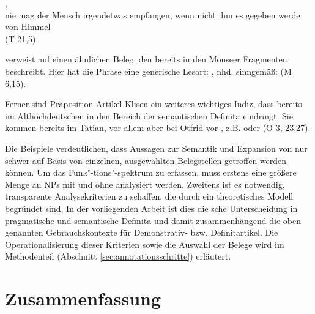 \begin{exe} 
\ex \label{ex:gen-tat-def}
	\gll {}     ,        \\
		nie mag der Mensch irgendetwas empfangen, {wenn nicht} ihm es gegeben werde von Himmel\\
	\trans {} (T 21,5)
\end{exe}
\noindent 
\textcite{Petrova2020} verweist auf einen ähnlichen Beleg, den bereits \textcite[60]{Hodler1954} in den Monseer Fragmenten beschreibt. Hier hat die Phrase   eine  generische Lesart:  , nhd. sinngemäß:  (M 6,15). 

Ferner sind Präposition-Artikel-Klisen ein weiteres wichtiges Indiz, dass  bereits im Althochdeutschen in den Bereich der semantischen Definita eindringt. Sie kommen bereits im Tatian, vor allem aber bei Otfrid vor \parencite[vgl.][]{Nubling1992,Schlachter2015}, z.B.   oder   (O 3, 23,27). 

Die Beispiele verdeutlichen, dass Aussagen zur Semantik und Expansion von  nur schwer auf Basis von einzelnen, ausgewählten Belegstellen getroffen werden können. Um das Funk"-tions"-spektrum zu erfassen, muss erstens eine größere Menge an NPs mit und ohne  analysiert werden. Zweitens ist es notwendig, transparente Analysekriterien zu schaffen, die durch ein theoretisches Modell begründet sind. In der vorliegenden Arbeit ist dies die \citeauthor{Lobner1985}sche Unterscheidung in pragmatische und semantische Definita und damit zusammenhängend die oben genannten Gebrauchskontexte für Demonstrativ- bzw. Definitartikel. Die Operationalisierung dieser Kriterien sowie die Auswahl der Belege wird im Methodenteil (Abschnitt \ref{sec:annotationsschritte}) erläutert. 

\section{Zusammenfassung}

